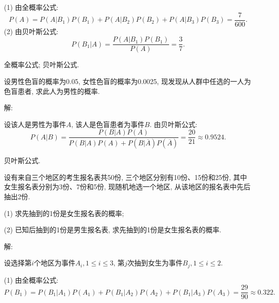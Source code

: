 \documentclass[standard]{ExBook}
\begin{document}
\begin{qitems}
\begin{bbox}
(1) 由全概率公式:
$$P(A)=P(A|B_{1})P(B_{1})+P(A|B_{2})P(B_{2})+P(A|B_{3})P(B_{3})=\frac{7}{600}.$$
(2) 由贝叶斯公式:
$$P(B_{1}|A)=\frac{P(A|B_{1})P(B_{1})}{P(A)}=\frac{3}{7}.$$

\textcolor{themeColor}{\selectfont {} 全概率公式; 贝叶斯公式.}
    \end{bbox}

\vspace{-5em}

    \begin{bbox}
    \begin{shaded}
        \qitem
设男性色盲的概率为0.05, 女性色盲的概率为0.0025, 现发现从人群中任选的一人为色盲患者, 求此人为男性的概率.
    \end{shaded}
    \end{bbox}

\vspace{-5em}

    \begin{bbox}
解: 

设该人是男性为事件$A$, 该人是色盲患者为事件$B$. 由贝叶斯公式:
$$P(A|B)=\frac{P(B|A)P(A)}{P(B|A)P(A)+P(B|\overline{A})P(\overline{A})}=\frac{20}{21}\approx0.9524.$$

\textcolor{themeColor}{\selectfont {} 贝叶斯公式.}
    \end{bbox}

\vspace{-5em}

    \begin{bbox}
    \begin{shaded}
        \qitem
设有来自三个地区的考生报名表共50份, 三个地区分别有10份、15份和25份, 其中女生报名表分别为3份、7份和5份, 现随机地选一个地区, 从该地区的报名表中先后抽出2份.

(1) 求先抽到的1份是女生报名表的概率;

(2) 已知后抽到的1份是男生报名表, 求先抽到的1份是女生报名表的概率.
    \end{shaded}
    \end{bbox}

\vspace{-5em}

    \begin{bbox}
解: 

设选择第$i$个地区为事件$A_{i},1 \leq i \leq 3$, 第$j$次抽到女生为事件$B_{j},1 \leq i \leq 2$.

(1) 由全概率公式:
$$P(B_{1})=P(B_{1}|A_{1})P(A_{1})+P(B_{1}|A_{2})P(A_{2})+P(B_{1}|A_{3})P(A_{3})=\frac{29}{90}\approx0.322.$$


\end{bbox}
\end{qitems}
\end{document}
